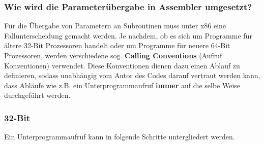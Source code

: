 \documentclass[12pt]{article}
\begin{document}
\subsubsection{Wie wird die Parameterübergabe in Assembler umgesetzt?}
\label{sec:calling_convention}
Für die Übergabe von Parametern an Subroutinen muss unter x86 eine Fallunterscheidung gemacht werden. Je nachdem, ob es sich um Programme für ältere 32-Bit Prozessoren handelt oder um Programme für neuere 64-Bit Prozessoren, werden verschiedene sog. \textbf{Calling Conventions} (Aufruf Konventionen) verwendet. Diese Konventionen dienen dazu einen Ablauf zu definieren, sodass unabhängig vom Autor des Codes darauf vertraut werden kann, dass Abläufe wie z.B. ein Unterprogrammaufruf \textbf{immer} auf die selbe Weise durchgeführt werden.

\subsubsection*{32-Bit}
Ein Unterprogrammaufruf kann in folgende Schritte untergliedert werden.
\end{document}
